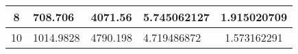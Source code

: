 \begin{table}[]
\begin{tabular}{|c|l|l|l|c|}
8                                                                                                          & 708.706                                                                                                                                                                   & 4071.56                                                                                                                                    & 5.745062127                            & 1.915020709         \\ \hline
10                                                                                                         & 1014.9828                                                                                                                                                                 & 4790.198                                                                                                                                   & 4.719486872                            & 1.573162291         \\ \hline
\end{tabular}
\end{table}

